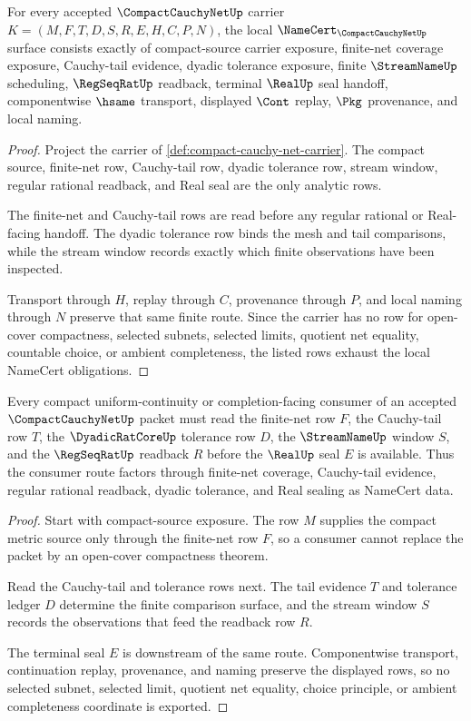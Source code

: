 \begin{theorem}
\label{thm:compact-cauchy-net-namecert-obligations}
For every accepted $\CompactCauchyNetUp$ carrier $K=(M,F,T,D,S,R,E,H,C,P,N)$, the local $\NameCert_{\CompactCauchyNetUp}$ surface consists exactly of compact-source carrier exposure, finite-net coverage exposure, Cauchy-tail evidence, dyadic tolerance exposure, finite $\StreamNameUp$ scheduling, $\RegSeqRatUp$ readback, terminal $\RealUp$ seal handoff, componentwise $\hsame$ transport, displayed $\Cont$ replay, $\Pkg$ provenance, and local naming.
\end{theorem}
\begin{proof}
Project the carrier of \autoref{def:compact-cauchy-net-carrier}. The compact source, finite-net row, Cauchy-tail row, dyadic tolerance row, stream window, regular rational readback, and Real seal are the only analytic rows.

The finite-net and Cauchy-tail rows are read before any regular rational or Real-facing handoff. The dyadic tolerance row binds the mesh and tail comparisons, while the stream window records exactly which finite observations have been inspected.

Transport through $H$, replay through $C$, provenance through $P$, and local naming through $N$ preserve that same finite route. Since the carrier has no row for open-cover compactness, selected subnets, selected limits, quotient net equality, countable choice, or ambient completeness, the listed rows exhaust the local NameCert obligations.
\end{proof}

\begin{theorem}
\label{thm:compact-cauchy-net-finite-tail-handoff}
Every compact uniform-continuity or completion-facing consumer of an accepted $\CompactCauchyNetUp$ packet must read the finite-net row $F$, the Cauchy-tail row $T$, the $\DyadicRatCoreUp$ tolerance row $D$, the $\StreamNameUp$ window $S$, and the $\RegSeqRatUp$ readback $R$ before the $\RealUp$ seal $E$ is available. Thus the consumer route factors through finite-net coverage, Cauchy-tail evidence, regular rational readback, dyadic tolerance, and Real sealing as NameCert data.
\end{theorem}
\begin{proof}
Start with compact-source exposure. The row $M$ supplies the compact metric source only through the finite-net row $F$, so a consumer cannot replace the packet by an open-cover compactness theorem.

Read the Cauchy-tail and tolerance rows next. The tail evidence $T$ and tolerance ledger $D$ determine the finite comparison surface, and the stream window $S$ records the observations that feed the readback row $R$.

The terminal seal $E$ is downstream of the same route. Componentwise transport, continuation replay, provenance, and naming preserve the displayed rows, so no selected subnet, selected limit, quotient net equality, choice principle, or ambient completeness coordinate is exported.
\end{proof}


